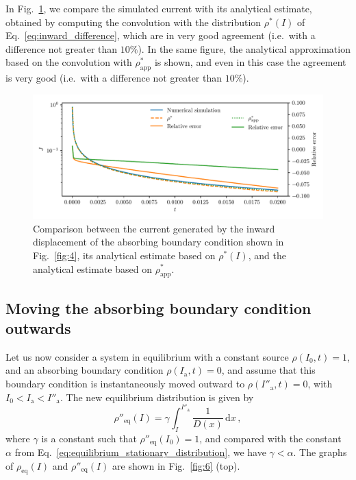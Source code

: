 In Fig.~\ref{fig:5}, we compare the simulated current with its analytical estimate, obtained by computing the convolution with the distribution $\rho^\ast(I)$ of Eq.~\eqref{eq:inward_difference}, which are in very good agreement {(i.e.\ with a difference not greater than $10\%$)}. In the same figure, the analytical approximation based on the convolution with $\rho^\ast_\text{app}$ is shown, and even in this case the agreement is very good {(i.e.\ with a difference not greater than $10\%$)}.

\begin{figure}[htp]
    \centering
    \includegraphics[width=\textwidth]{4_probing_the_diffusive_behavior/figs/final/current_backwards.pdf}
    \caption{Comparison between the current generated by the inward displacement of the absorbing boundary condition shown in Fig.~\ref{fig:4}, its analytical estimate based on $\rho^\ast(I)$, and the analytical estimate based on $\rho^\ast_\text{app}$.}
    \label{fig:5}
\end{figure}


\subsection{Moving the absorbing boundary condition outwards}


Let us now consider a system in equilibrium with a constant source $\rho(I_0, t)=1$, and an absorbing boundary condition $\rho(I_\mathrm{a}, t)=0$, and assume that this boundary condition is instantaneously moved outward to $\rho(I''_\mathrm{a}, t)=0$, with $I_0 < I_\mathrm{a} < I''_\mathrm{a}$. The new equilibrium distribution is given by
\begin{equation}
    \rho''_\text{eq}(I) = \gamma \int_I^{I''_\mathrm{a}} \frac{1}{D(x)}\,\mathrm{d}x\,,
\end{equation}
where $\gamma$ is a constant such that $\rho''_\text{eq}(I_0)=1$, and compared with the constant $\alpha$ from Eq.~\eqref{eq:equilibrium_stationary_distribution}, we have $\gamma < \alpha$. The graphs of $\rho_\text{eq}(I)$ and $\rho''_\text{eq}(I)$ are shown in Fig.~\ref{fig:6} (top). 

